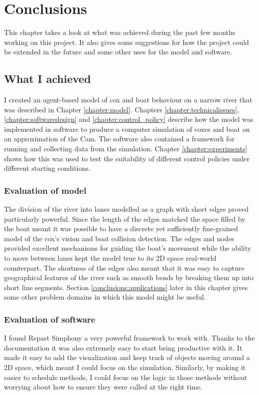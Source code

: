 \chapter{Conclusions}\label{chapter:conclusions}
  This chapter takes a look at what was achieved during the past few months working on this project. It also gives some suggestions for how the project could be extended in the future and some other uses for the model and software.
  
  \section{What I achieved}
  I created an agent-based model of cox and boat behaviour on a narrow river that was described in Chapter \ref{chapter:model}. Chapters \ref{chapter:technicalissues}, \ref{chapter:softwaredesign} and \ref{chapter:control_policy} describe how the model was implemented in software to produce a computer simulation of coxes and boat on an approximation of the Cam. The software also contained a framework for running and collecting data from the simulation. Chapter \ref{chapter:experiments} shows how this was used to test the suitability of different control policies under different starting conditions.
  
  \subsection{Evaluation of model}
  The division of the river into lanes modelled as a graph with short edges proved particularly powerful. Since the length of the edges matched the space filled by the boat meant it was possible to have a discrete yet sufficiently fine-grained model of the cox's vision and boat collision detection. The edges and nodes provided excellent mechanisms for guiding the boat's movement while the ability to move between lanes kept the model true to its 2D space real-world counterpart. The shortness of the edges also meant that it was easy to capture geographical features of the river such as smooth bends by breaking them up into short line segments. Section \ref{conclusions:applications} later in this chapter gives some other problem domains in which this model might be useful.
  
  \subsection{Evaluation of software}
  I found Repast Simphony a very powerful framework to work with. Thanks to the documentation it was also extremely easy to start being productive with it. It made it easy to add the visualization and keep track of objects moving around a 2D space, which meant I could focus on the simulation. Similarly, by making it easier to schedule methods, I could focus on the logic in those methods without worrying about how to ensure they were called at the right time.
  
